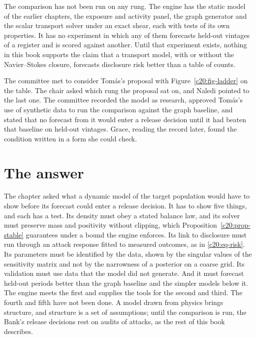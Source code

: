 The comparison has not been run on any rung. The engine has the static model of the
earlier chapters, the exposure and activity panel, the graph generator and the scalar transport solver under an exact shear, each with tests of its own properties. It has no experiment
in which any of them forecasts held-out vintages of a register and is scored against another.
Until that experiment exists, nothing in this book supports the claim that a transport model,
with or without the Navier--Stokes closure, forecasts disclosure risk better than a table of
counts.

The committee met to consider Tom\'as's proposal with Figure~\ref{c20:fig-ladder} on the table. The chair
asked which rung the proposal sat on, and Naledi pointed to the last one. The committee
recorded the model as research, approved Tom\'as's use of synthetic data to run the comparison against the graph baseline, and stated that no forecast from it would enter a release
decision until it had beaten that baseline on held-out vintages. Grace, reading the record
later, found the condition written in a form she could check.

\section{The answer}

The chapter asked what a dynamic model of the target population would have to show before its forecast could enter a release decision. It has to show five things, and each has a test.
Its density must obey a stated balance law, and its solver must preserve mass and positivity
without clipping, which Proposition~\ref{c20:prop-stable} guarantees under a bound the engine enforces. Its
link to disclosure must run through an attack response fitted to measured outcomes, as in
\eqref{c20:eq-risk}. Its parameters must be identified by the data, shown by the singular values of the
sensitivity matrix and not by the narrowness of a posterior on a coarse grid. Its validation
must use data that the model did not generate. And it must forecast held-out periods better
than the graph baseline and the simpler models below it. The engine meets the first and
supplies the tools for the second and third. The fourth and fifth have not been done. A
model drawn from physics brings structure, and structure is a set of assumptions; until the
comparison is run, the Bank's release decisions rest on audits of attacks, as the rest of this
book describes.

